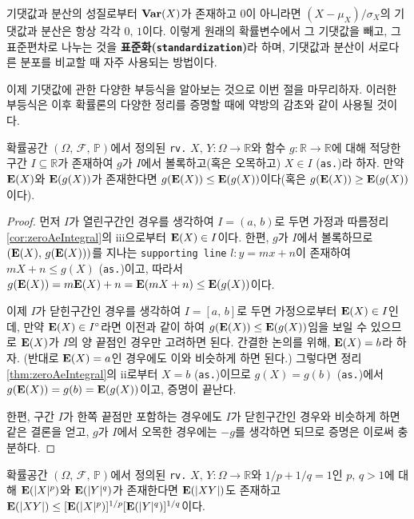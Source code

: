 기댓값과 분산의 성질로부터 $\mathbf{Var}(X)$가 존재하고 $0$이 아니라면 $(X-\mu_X)/\sigma_X$의 기댓값과 분산은 항상 각각 $0,\,1$이다. 이렇게 원래의 확률변수에서 그 기댓값을 빼고, 그 표준편차로 나누는 것을 \textbf{표준화(\texttt{standardization})}라 하며, 기댓값과 분산이 서로다른 분포를 비교할 때 자주 사용되는 방법이다.

이제 기댓값에 관한 다양한 부등식을 알아보는 것으로 이번 절을 마무리하자. 이러한 부등식은 이후 확률론의 다양한 정리를 증명할 때에 약방의 감초와 같이 사용될 것이다.

\begin{theorem}
    확률공간 $(\Omega,\,\mathcal{F},\,\mathbb{P})$에서 정의된 \texttt{rv.} $X,\,Y:\Omega\to\mathbb{R}$와 함수 $g:\mathbb{R}\to\mathbb{R}$에 대해 적당한 구간 $I\subseteq\mathbb{R}$가 존재하여 $g$가 $I$에서 볼록하고(혹은 오목하고) $X\in I$ (\texttt{as.})라 하자. 만약 $\mathbf{E}(X)$와 $\mathbf{E}(g(X))$가 존재한다면 $g(\mathbf{E}(X))\leq\mathbf{E}(g(X))$이다(혹은 $g(\mathbf{E}(X))\geq\mathbf{E}(g(X))$이다).
\end{theorem}

\begin{proof}
    먼저 $I$가 열린구간인 경우를 생각하여 $I=(a,\,b)$로 두면 가정과 따름정리 \ref{cor:zeroAeIntegral}의 iii으로부터 $\mathbf{E}(X)\in I$이다. 한편, $g$가 $I$에서 볼록하므로 $(\mathbf{E}(X),\,g(\mathbf{E}(X)))$를 지나는 \texttt{supporting line} $l:y=mx+n$이 존재하여 $mX+n\leq g(X)$ (\texttt{as.})이고, 따라서 $g(\mathbf{E}(X))=m\mathbf{E}(X)+n=\mathbf{E}(mX+n)\leq\mathbf{E}(g(X))$이다.

    이제 $I$가 닫힌구간인 경우를 생각하여 $I=[a,\,b]$로 두면 가정으로부터 $\mathbf{E}(X)\in I$인데, 만약 $\mathbf{E}(X)\in I^\circ$라면 이전과 같이 하여 $g(\mathbf{E}(X))\leq\mathbf{E}(g(X))$임을 보일 수 있으므로 $\mathbf{E}(X)$가 $I$의 양 끝점인 경우만 고려하면 된다. 간결한 논의를 위해, $\mathbf{E}(X)=b$라 하자. (반대로 $\mathbf{E}(X)=a$인 경우에도 이와 비슷하게 하면 된다.) 그렇다면 정리 \ref{thm:zeroAeIntegral}의 ii로부터 $X=b$ (\texttt{as.})이므로 $g(X)=g(b)$ (\texttt{as.})에서 $g(\mathbf{E}(X))=g(b)=\mathbf{E}(g(X))$이고, 증명이 끝난다.

    한편, 구간 $I$가 한쪽 끝점만 포함하는 경우에도 $I$가 닫힌구간인 경우와 비슷하게 하면 같은 결론을 얻고, $g$가 $I$에서 오목한 경우에는 $-g$를 생각하면 되므로 증명은 이로써 충분하다.
\end{proof}

\begin{theorem}
    확률공간 $(\Omega,\,\mathcal{F},\,\mathbb{P})$에서 정의된 \texttt{rv.} $X,\,Y:\Omega\to\mathbb{R}$와 $1/p+1/q=1$인 $p,\,q>1$에 대해 $\mathbf{E}(|X|^p)$와 $\mathbf{E}(|Y|^q)$가 존재한다면 $\mathbf{E}(|XY|)$도 존재하고 $\mathbf{E}(|XY|)\leq[\mathbf{E}(|X|^p)]^{1/p}[\mathbf{E}(|Y|^q)]^{1/q}$이다.
\end{theorem}

